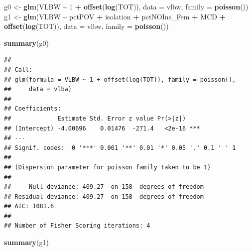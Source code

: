 \documentclass[
]{book}
\newenvironment{Shaded}{\begin{snugshade}}{\end{snugshade}}
\newcommand{\AttributeTok}[1]{\textcolor[rgb]{0.13,0.29,0.53}{#1}}
\newcommand{\DecValTok}[1]{\textcolor[rgb]{0.00,0.00,0.81}{#1}}
\newcommand{\FunctionTok}[1]{\textcolor[rgb]{0.13,0.29,0.53}{\textbf{#1}}}
\newcommand{\NormalTok}[1]{#1}
\newcommand{\OtherTok}[1]{\textcolor[rgb]{0.56,0.35,0.01}{#1}}
\newcommand{\SpecialCharTok}[1]{\textcolor[rgb]{0.81,0.36,0.00}{\textbf{#1}}}
\begin{document}
\begin{Shaded}
\begin{Highlighting}[]
\NormalTok{g0 }\OtherTok{\textless{}{-}} \FunctionTok{glm}\NormalTok{(VLBW }\SpecialCharTok{\textasciitilde{}} \DecValTok{1} \SpecialCharTok{+} \FunctionTok{offset}\NormalTok{(}\FunctionTok{log}\NormalTok{(TOT)), }
          \AttributeTok{data =}\NormalTok{ vlbw,}
          \AttributeTok{family =} \FunctionTok{poisson}\NormalTok{())}
\NormalTok{g1 }\OtherTok{\textless{}{-}} \FunctionTok{glm}\NormalTok{(VLBW }\SpecialCharTok{\textasciitilde{}}\NormalTok{ pctPOV }\SpecialCharTok{+}\NormalTok{ isolation }\SpecialCharTok{+}\NormalTok{ pctNOIns\_Fem }\SpecialCharTok{+}\NormalTok{ MCD }\SpecialCharTok{+}
            \FunctionTok{offset}\NormalTok{(}\FunctionTok{log}\NormalTok{(TOT)), }
          \AttributeTok{data =}\NormalTok{ vlbw,}
          \AttributeTok{family =} \FunctionTok{poisson}\NormalTok{())}
\end{Highlighting}
\end{Shaded}

\begin{Shaded}
\begin{Highlighting}[]
\FunctionTok{summary}\NormalTok{(g0)}
\end{Highlighting}
\end{Shaded}

\begin{verbatim}
## 
## Call:
## glm(formula = VLBW ~ 1 + offset(log(TOT)), family = poisson(), 
##     data = vlbw)
## 
## Coefficients:
##             Estimate Std. Error z value Pr(>|z|)    
## (Intercept) -4.00696    0.01476  -271.4   <2e-16 ***
## ---
## Signif. codes:  0 '***' 0.001 '**' 0.01 '*' 0.05 '.' 0.1 ' ' 1
## 
## (Dispersion parameter for poisson family taken to be 1)
## 
##     Null deviance: 409.27  on 158  degrees of freedom
## Residual deviance: 409.27  on 158  degrees of freedom
## AIC: 1081.6
## 
## Number of Fisher Scoring iterations: 4
\end{verbatim}

\begin{Shaded}
\begin{Highlighting}[]
\FunctionTok{summary}\NormalTok{(g1)}
\end{Highlighting}
\end{Shaded}
\end{document}
